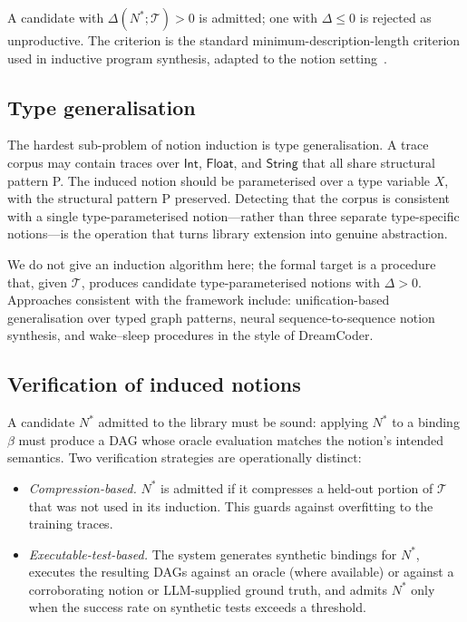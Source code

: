 \documentclass[11pt,a4paper]{article}
\theoremstyle{plain}
\theoremstyle{definition}
\theoremstyle{remark}
\begin{document}
A candidate with $\Delta(N^\ast; \mathcal{T}) > 0$ is admitted; one with $\Delta \le 0$ is rejected as unproductive. The criterion is the standard minimum-description-length criterion used in inductive program synthesis, adapted to the notion setting~\cite{ellis2021dreamcoder}.

\subsection{Type generalisation}

The hardest sub-problem of notion induction is type generalisation. A trace corpus may contain traces over $\mathsf{Int}$, $\mathsf{Float}$, and $\mathsf{String}$ that all share structural pattern P. The induced notion should be parameterised over a type variable $X$, with the structural pattern P preserved. Detecting that the corpus is consistent with a single type-parameterised notion---rather than three separate type-specific notions---is the operation that turns library extension into genuine abstraction.

We do not give an induction algorithm here; the formal target is a procedure that, given $\mathcal{T}$, produces candidate type-parameterised notions with $\Delta > 0$. Approaches consistent with the framework include: unification-based generalisation over typed graph patterns, neural sequence-to-sequence notion synthesis, and wake--sleep procedures in the style of DreamCoder.

\subsection{Verification of induced notions}

A candidate $N^\ast$ admitted to the library must be sound: applying $N^\ast$ to a binding $\beta$ must produce a DAG whose oracle evaluation matches the notion's intended semantics. Two verification strategies are operationally distinct:

\begin{itemize}[topsep=2pt,itemsep=2pt]
  \item \emph{Compression-based.} $N^\ast$ is admitted if it compresses a held-out portion of $\mathcal{T}$ that was not used in its induction. This guards against overfitting to the training traces.
  \item \emph{Executable-test-based.} The system generates synthetic bindings for $N^\ast$, executes the resulting DAGs against an oracle (where available) or against a corroborating notion or LLM-supplied ground truth, and admits $N^\ast$ only when the success rate on synthetic tests exceeds a threshold.
\end{itemize}
\end{document}
